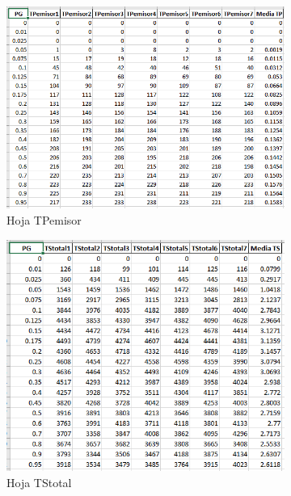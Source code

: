 \documentclass{article}
\begin{document}
\begin{figure}[h]
	\centering
	\begin{subfigure}{0.5\textwidth}
		\includegraphics[width=\linewidth]{src/TPemisor.png}
		\caption{Hoja TPemisor}
		\label{fig:TPemisorcsv}
	\end{subfigure}%
	\begin{subfigure}{0.5\textwidth}
		\includegraphics[width=\linewidth]{src/TStotal.png}
		\caption{Hoja TStotal}
		\label{fig:TStotalcsv}
	\end{subfigure}
	\caption{}
	\label{fig:Ambastablas2}
\end{figure}
\end{document}
